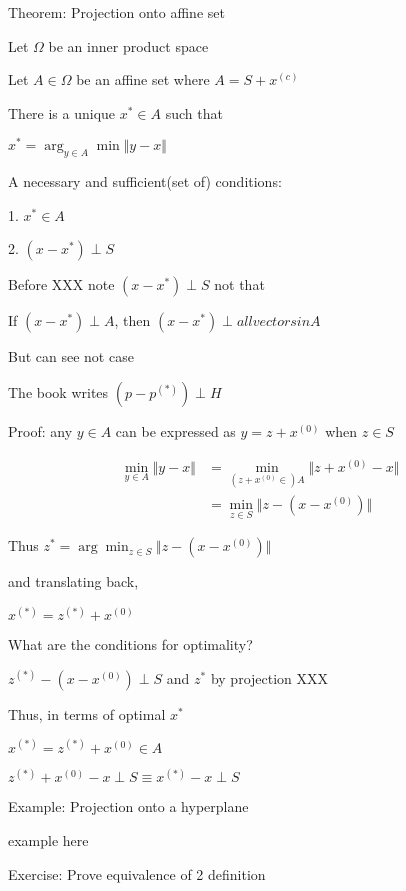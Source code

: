 Theorem: Projection onto affine set

Let $\Omega$ be an inner product space

Let $A\in \Omega$ be an affine set where $A=S+x^{(c)}$

There is a unique $x^{*}\in A$ such that

$x^{*} = \arg_{y\in A}\min \Vert y-x\Vert$

A necessary and sufficient(set of) conditions:

1. $x^{*} \in A$

2. $(x-x^{*})\perp S$



Before XXX note $(x-x^{*})\perp S$ not that

If $(x-x^{*})\perp A$, then $(x-x^{*})\perp all vectors in A$

But can see not case

\begin{marginfigure}
	\centering
	\resizebox{7.5cm}{3cm}{}
	\caption{}
	\label{}
\end{marginfigure}

The book writes $(p-p^{(*)})\perp H$



Proof: any $y\in A$ can be expressed as $y=z+x^{(0)}$ when $z\in S$

\begin{align*}
\min_{y\in A} \Vert y-x\Vert&=\min_{(z+x^{(0)}\in) A} \Vert z+x^{(0)}-x\Vert\\
&=\min_{z\in S} \Vert z-(x-x^{(0)})\Vert
\end{align*}

Thus $z^{*}=\arg\min_{z\in S} \Vert z-(x-x^{(0)})\Vert$

and translating back,

$x^{(*)}=z^{(*)}+x^{(0)}$


What are the conditions for optimality?

$z^{(*)}-(x-x^{(0)})\perp S$ and $z^{*}$ by projection XXX

Thus, in terms of optimal $x^{*}$

$x^{(*)}=z^{(*)}+x^{(0)} \in A$

$z^{(*)}+x^{(0)}-x \perp S \equiv x^{(*)}-x\perp S$



Example: Projection onto a hyperplane

example here 

Exercise: Prove equivalence of 2 definition


